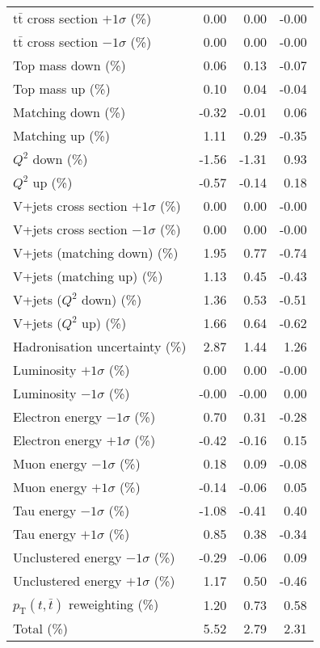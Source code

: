 \begin{table}[htbp]
{\begin{tabular}{lrrr}
$\mathrm{t}\bar{\mathrm{t}}$ cross section $+1\sigma$ (\%) & 0.00 & 0.00 & -0.00 \\ 
$\mathrm{t}\bar{\mathrm{t}}$ cross section $-1\sigma$ (\%) & 0.00 & 0.00 & -0.00 \\ 
Top mass down (\%) & 0.06 & 0.13 & -0.07 \\ 
Top mass up (\%) & 0.10 & 0.04 & -0.04 \\ 
Matching down (\%) & -0.32 & -0.01 & 0.06 \\ 
Matching up (\%) & 1.11 & 0.29 & -0.35 \\ 
$Q^{2}$ down (\%) & -1.56 & -1.31 & 0.93 \\ 
$Q^{2}$ up (\%) & -0.57 & -0.14 & 0.18 \\ 
V+jets cross section \ensuremath{+1\sigma} (\%) & 0.00 & 0.00 & -0.00 \\ 
V+jets cross section \ensuremath{-1\sigma} (\%) & 0.00 & 0.00 & -0.00 \\ 
V+jets (matching down) (\%) & 1.95 & 0.77 & -0.74 \\ 
V+jets (matching up) (\%) & 1.13 & 0.45 & -0.43 \\ 
V+jets ($Q^{2}$ down) (\%) & 1.36 & 0.53 & -0.51 \\ 
V+jets ($Q^{2}$ up) (\%) & 1.66 & 0.64 & -0.62 \\ 
Hadronisation uncertainty (\%) & 2.87 & 1.44 & 1.26 \\ 
Luminosity $+1\sigma$ (\%) & 0.00 & 0.00 & -0.00 \\ 
Luminosity $-1\sigma$ (\%) & -0.00 & -0.00 & 0.00 \\ 
Electron energy $-1\sigma$ (\%) & 0.70 & 0.31 & -0.28 \\ 
Electron energy $+1\sigma$ (\%) & -0.42 & -0.16 & 0.15 \\ 
Muon energy $-1\sigma$ (\%) & 0.18 & 0.09 & -0.08 \\ 
Muon energy $+1\sigma$ (\%) & -0.14 & -0.06 & 0.05 \\ 
Tau energy $-1\sigma$ (\%) & -1.08 & -0.41 & 0.40 \\ 
Tau energy $+1\sigma$ (\%) & 0.85 & 0.38 & -0.34 \\ 
Unclustered energy $-1\sigma$ (\%) & -0.29 & -0.06 & 0.09 \\ 
Unclustered energy $+1\sigma$ (\%) & 1.17 & 0.50 & -0.46 \\ 
$p_\mathrm{T}(t,\bar{t})$ reweighting (\%) & 1.20 & 0.73 & 0.58 \\ 
\hline 
Total (\%) & 5.52  & 2.79  & 2.31 \\ 
\hline 
\end{tabular}
}
\end{table}
